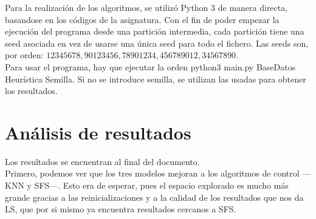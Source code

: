 Para la realización de los algoritmos, se utilizó Python 3 de manera directa, basandose en los códigos de la asignatura. Con el fin de poder empezar la ejecución del programa desde una partición intermedia, cada partición tiene una seed asociada en vez de usarse una única seed para todo el fichero. Las seeds son, por orden: $12345678,90123456,78901234,456789012,34567890$. \\

Para usar el programa, hay que ejecutar la orden  python3 main.py BaseDatos Heurística Semilla. Si no se introduce semilla, se utilizan las usadas para obtener los resultados.
\newpage
\section{Análisis de resultados}
\begin{table}[]
\centering
\caption{Resumen}
\label{my-label}
\end{table}

Los resultados se encuentran al final del documento.\\

Primero, podemos ver que los tres modelos mejoran a los algoritmos de control ---KNN y SFS---. Esto era de esperar, pues el espacio explorado es mucho más grande gracias a las reinicializaciones y a la calidad de los resultados que nos da LS, que por si mismo ya encuentra resultados cercanos a SFS.\\

